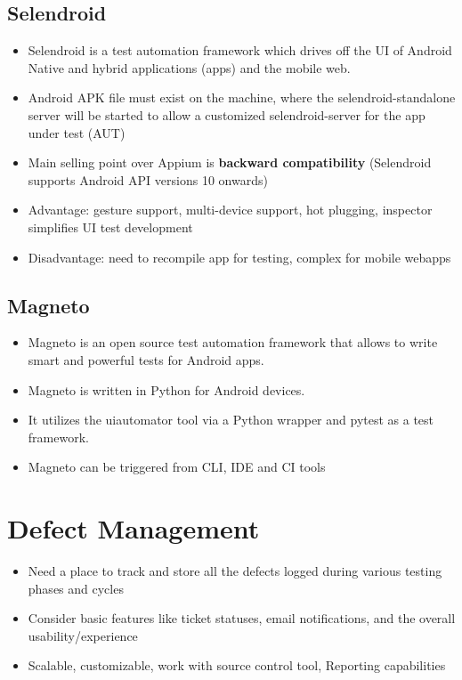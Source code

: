 \documentclass{article}
\begin{document}
\subsection{Selendroid}
\begin{itemize}
    \item Selendroid is a test automation framework  which drives off the UI of Android Native and  hybrid applications (apps) and the mobile web.
    
    \item Android APK file must exist on the machine,  where the selendroid-standalone server will be started to allow a customized selendroid-server for the app under test (AUT)
    
    \item Main selling point over Appium is \textbf{backward compatibility} (Selendroid supports Android API versions 10 onwards)
    
    \item Advantage: gesture support, multi-device support, hot plugging, inspector simplifies UI test development
    
    \item Disadvantage: need to recompile app for testing, complex for mobile webapps
\end{itemize}

\subsection{Magneto}
\begin{itemize}
    \item Magneto is an open source test automation framework that allows to write smart and powerful tests for Android apps. 
    
    \item Magneto is written in Python for Android devices. 
    
    \item It utilizes the uiautomator tool via a Python wrapper and pytest as a test framework.

    \item Magneto can be triggered from CLI, IDE and CI tools
\end{itemize}

\section{Defect Management}
\begin{itemize}
    \item  Need a place to track and store all the defects logged during various testing phases and cycles
    
    \item Consider basic features like ticket statuses, email notifications, and the overall usability/experience

    \item Scalable, customizable, work with source control tool, Reporting capabilities

\end{itemize}
\end{document}
